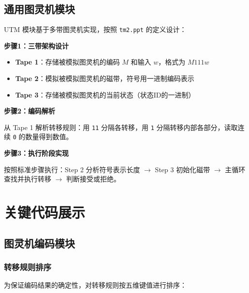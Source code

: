 \documentclass{sysucseexp}
\begin{document}
\subsection{通用图灵机模块}

UTM 模块基于多带图灵机实现，按照 \texttt{tm2.ppt} 的定义设计：

\textbf{步骤1：三带架构设计}

\begin{itemize}
    \item \textbf{Tape 1}：存储被模拟图灵机的编码 $M$ 和输入 $w$，格式为 $M111w$
    \item \textbf{Tape 2}：模拟被模拟图灵机的磁带，符号用一进制编码表示
    \item \textbf{Tape 3}：存储被模拟图灵机的当前状态（状态ID的一进制）
\end{itemize}

\textbf{步骤2：编码解析}

从 Tape 1 解析转移规则：用 \texttt{11} 分隔各转移，用 \texttt{1} 分隔转移内部各部分，读取连续 \texttt{0} 的数量得到数值。

\textbf{步骤3：执行阶段实现}

按照标准步骤执行：Step 2 分析符号表示长度 $\rightarrow$ Step 3 初始化磁带 $\rightarrow$ 主循环查找并执行转移 $\rightarrow$ 判断接受或拒绝。


\section{关键代码展示}

\subsection{图灵机编码模块}

\subsubsection{转移规则排序}

为保证编码结果的确定性，对转移规则按五维键值进行排序：
\end{document}
